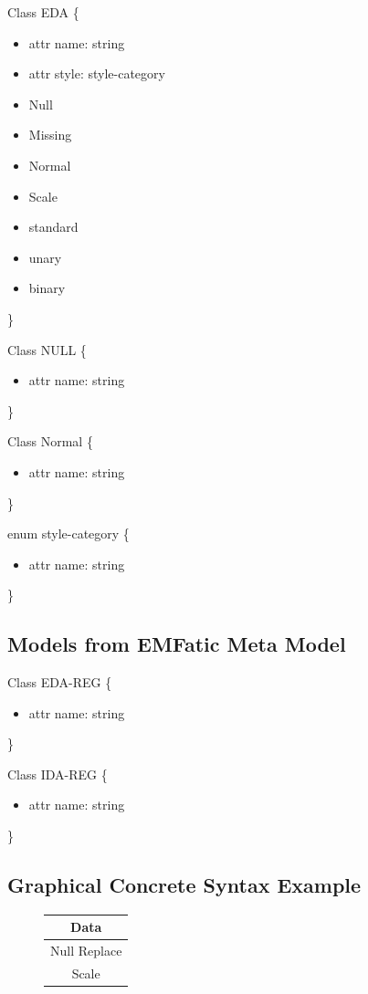 Class EDA \{
\begin {itemize}
	\item attr name: string
	\item attr style: style-category
	\item Null
	\item Missing
	\item  Normal
	\item Scale
	\item standard
	\item unary
	\item binary		
\end{itemize}
\}


Class NULL \{
\begin {itemize}
	\item attr name: string
		
\end{itemize}
\}

Class Normal \{
\begin {itemize}
	\item attr name: string
		
\end{itemize}
\}



enum style-category \{
\begin {itemize}
	\item attr name: string
		
\end{itemize}
\}


\subsection{Models from EMFatic Meta Model}


Class EDA-REG \{
\begin {itemize}
	\item attr name: string
		
\end{itemize}
\}


Class IDA-REG \{
\begin {itemize}
	\item attr name: string
		
\end{itemize}
\}


\subsection{Graphical Concrete Syntax Example}
\begin{figure} [!htb]
\begin{tabular}{|c|}
\hline
Data\\
\hline
Null Replace\\
\hline
Scale\\
\hline

\end{tabular}
\end{figure}


